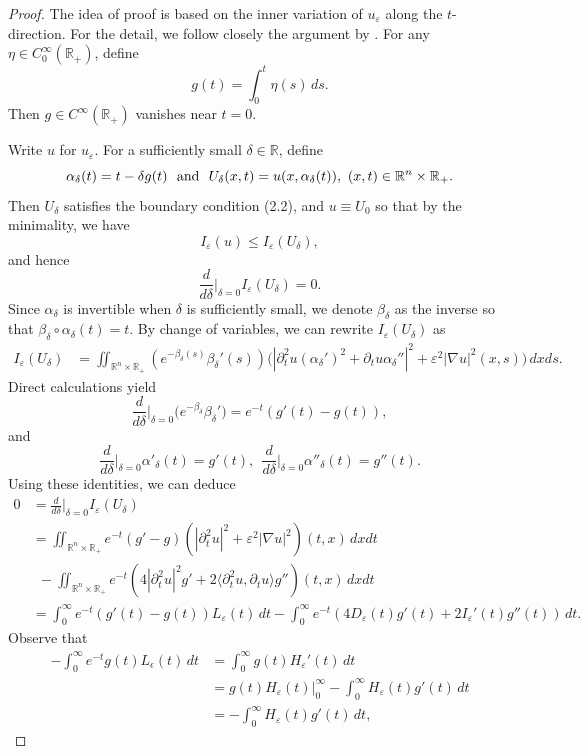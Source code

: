 \documentclass[12pt,twoside,reqno]{amsart}
\theoremstyle{definition}              %
\theoremstyle{remark}                  %
\newcommand{\R}{\mathbb{R}}                 %
\newcommand{\eps}{\varepsilon}
\renewcommand{\1}{\mathbbm{1}}                                      %
\numberwithin{equation}{section}
\numberwithin{definition}{section}
\numberwithin{theorem}{section}
\numberwithin{remark}{section}
\begin{document}
\begin{proof} The idea of proof is based on the inner variation of $u_\eps$ along the $t$-direction.
For the detail, we follow closely the argument by \cite[Proposition 3.1]{Serra-Tilli2012}.
For any $\eta\in C_0^\infty(\mathbb{R}_+)$, define
$$
g(t)=\int_0^t\eta(s)\,ds.
$$
Then $g\in C^\infty(\mathbb{R}_+)$ vanishes near $t=0$. 

Write $u$ for $u_\eps$. For a sufficiently small $\delta\in\mathbb{R}$, define
$$\alpha_\delta(t)=t-\delta g(t) 
\ \ {\rm{and}}\ \ U_\delta(x,t )=u(x, \alpha_\delta(t)), 
\ (x,t)\in\R^n\times\mathbb{R}_+.$$
Then $U_\delta$ satisfies the boundary condition (2.2), and $u\equiv U_0$ so that by the minimality, we have 
$$
I_\eps(u)\le I_\eps(U_\delta), 
$$
and hence
$$
\frac{d}{d\delta}\big|_{\delta=0}I_\eps
(U_\delta)=0.
$$
Since $\alpha_\delta$ is invertible when
$\delta$ is sufficiently small, we  denote $\beta_\delta$ as the inverse so that $\beta_\delta\circ\alpha_\delta(t)=t$.
By change of variables, we can rewrite
$I_\eps(U_\delta)$ as
\begin{align*}
I_\eps(U_\delta)
&=\iint_{\mathbb{R}^n\times\R_+}
(e^{-\beta_\delta(s)}\beta_\delta'(s))
\big(|\partial_t^2u(\alpha_\delta')^2+\partial_tu\alpha_\delta''|^2+\eps^2 |\nabla u|^2(x,s)\big)\,dxds.
\end{align*}
Direct calculations yield
\[
\frac{d}{d\delta}\big|_{\delta=0}\big(e^{-\beta_\delta}\beta_\delta'\big)
=e^{-t}(g'(t)-g(t)),
\]
and
\[
\frac{d}{d\delta}\big|_{\delta=0}\alpha'_\delta(t)=g'(t),
\ \ \frac{d}{d\delta}\big|_{\delta=0}\alpha''_\delta(t)=g''(t).
\]
Using these identities, we can deduce
\begin{align*}
0&=\frac{d}{d\delta}\big|_{\delta=0}I_\eps
(U_\delta)\\
&=\iint_{\mathbb{R}^n\times\R_+}
e^{-t}(g'-g)(|\partial_t^2u|^2+\eps^2|\nabla u|^2)(t,x)\,dxdt\\
&\ \ -\iint_{\mathbb{R}^n\times\R_+}
e^{-t}(4|\partial_t^2u|^2g'+2\langle \partial_t^2u, \partial_t u\rangle g'')(t,x)\,dxdt\\
&=\int_0^\infty
e^{-t}(g'(t)-g(t))L_\eps(t)\,dt-\int_0^\infty
e^{-t}(4D_\eps(t) g'(t)+2 I_\eps'(t) g''(t))\,dt.
\end{align*}
Observe that
\begin{align*}
-\int_0^\infty e^{-t} g(t)L_\epsilon(t)\,dt 
&=\int_0^\infty g(t)H_\eps'(t)\,dt\\
&=g(t)H_\eps(t)\big|_{0}^\infty-\int_0^\infty H_\eps(t)g'(t)\,dt\\
&=-\int_0^\infty H_\eps(t)g'(t)\,dt,

\end{align*}
\end{proof}
\end{document}
